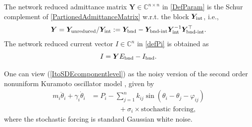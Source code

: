 \documentclass[10pt,twocolumn]{IEEEtran}
\begin{document}
The network reduced admittance matrix $\bm{Y}\in\mathbb{C}^{n\times n}$ in \eqref{DefParam} is the Schur complement of \eqref{PartionedAdmittanceMatrix} w.r.t. the block $\bm{Y}_{\rm{int}}$, i.e.,
\[\bm{Y} = \bm{Y}_{\rm{unreduced}} / \bm{Y}_{\rm{int}} := \bm{Y}_{\rm{bnd}} - \bm{Y}_{\rm{bnd{\text{-}}int}} \bm{Y}_{\rm{int}}^{-1}\bm{Y}_{\rm{bnd{\text{-}}int}}^{\top}.\]
The network reduced current vector $I\in\mathbb{C}^{n}$ in \eqref{defPi} is obtained as
\[I  = \bm{Y}E_{\rm{bnd}} - I_{\rm{bnd}}.\]

One can view (\ref{ItoSDEcomponentlevel}) as the noisy version of the second order nonuniform Kuramoto oscillator model \cite{dorfler2012synchronization,rodrigues2016kuramoto}, given by
\begin{align}
m_{i}\ddot{\theta}_{i} + \gamma_{i}\dot{\theta}_{i} &= P_{i} - \displaystyle\sum_{j=1}^{n} k_{ij}\sin\left(\theta_{i} - \theta_{j} - \varphi_{ij}\right) \nonumber\\
&\qquad\qquad+ \sigma_{i} \times \text{stochastic forcing},
\label{LangevinForm}	
\end{align}
where the stochastic forcing is standard Gaussian white noise. 
\end{document}

